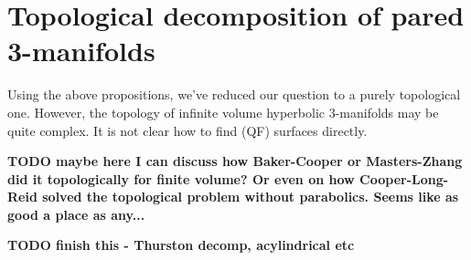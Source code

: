 \section{Topological decomposition of pared 3-manifolds}

Using the above propositions, we've reduced our question to a purely
topological one. However, the topology of infinite volume hyperbolic
3-manifolds may be quite complex. It is not clear how to find (QF) surfaces
directly.

\textbf{ TODO maybe here I can discuss how Baker-Cooper or Masters-Zhang did it
topologically for finite volume? Or even on how Cooper-Long-Reid solved the
topological problem without parabolics. Seems like as good a place as any...}


\textbf{TODO finish this - Thurston decomp, acylindrical etc}

